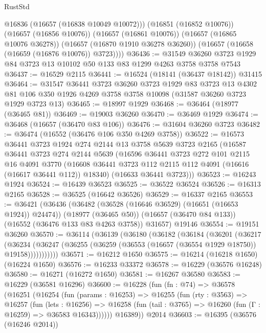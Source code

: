 \begin{lexlean}{RustStd}
\begin{coremodule}
          @16836
          (@16657 (@16838 @10049 @10072)))
        (@16851 (@16852 @10076))
        (@16657 (@16856 @10076))
        (@16657 (@16861 @10076))
        (@16657 (@16865 @10076 @36278))
        (@16657 (@16870 @1910 @36278 @36260))
        (@16657 (@16658 (@16659 (@16876 @10076)) @3723))))
@36436 := @31549 @36260 @3723 @1929 @84 @3723 @13 @10102 @50 @133 @83 @1299 @4263 @3758 @3758 @7543
@36437 := @16529 @2115
@36441 := @16524 (@18141 (@36437 @18142)) @31415
@36464 := @31547
    @36441
    @3723
    @36260
    @3723
    @1929
    @83
    @3723
    @13
    @4302
    @81
    @106
    @350
    @1926
    @4269
    @3758
    @3758
    @10098
    (@31587 @36260 @3723 @1929 @3723 @13)
@36465 := @18997 @1929
@36468 := @36464 (@18977 (@36465 @81))
@36469 := @19003 @36260
@36470 := @36469 @1929
@36474 := @36468 (@16657 (@36470 @83 @106))
@36476 := @31604 @36260 @3723
@36482 := @36474 (@16552 (@36476 @106 @350 @4269 @3758))
@36522 := @16573
    @36441
    @3723
    @1924
    @274
    @2144
    @13
    @3758
    @5639
    @3723
    @2165
    (@16587
      @36441
      @3723
      @274
      @2144
      @5639
      (@16596
        @36441
        @3723
        @272
        @101
        @2115
        @16
        @4091
        @3770
        (@16608 @36441 @3723 @112 @2115 @112 @4091 (@16616 (@16617 @36441 @112)) @18340)
        (@16633 @36441 @3723)))
@36523 := @16243 @1924
@36524 := @16439 @36523
@36525 := @36522 @36524
@36526 := @16313 @2165
@36528 := @36525 (@16642 @36526)
@36529 := @16337 @2165
@36553 := @36421
    (@36436
      (@36482 (@36528 (@16646 @36529) (@16651 (@16653 @1924)) @24474))
      (@18977 (@36465 @50))
      (@16657 (@36470 @84 @133))
      (@16552 (@36476 @133 @83 @4263 @3758))
      @31657)
    @19146
@36554 := @19151 @36260
@36570 := @36114
    (@36139
      (@36180
        (@36182
          (@36184
            (@36201
              (@36217
                (@36234
                  (@36247 (@36255 (@36259 (@36553 (@16657 (@36554 @1929 @18750)) @19158)))))))))))
@36571 := @16212 @1650
@36575 := @16214 (@16218 @1650) (@16224 @1650)
@36576 := @16233 @33372
@36578 := @16229 (@36576 @16248)
@36580 := @16271 (@16272 @1650)
@36581 := @16267 @36580
@36583 := @16229 (@36581 @16296)
@36600 := @16228
    (fun (fn : @74) =>
    @36578
      (@16251
        (@16254
          (fun (params : @16253) =>
          @16255
            (fun (rty : @3563) =>
            @16257
              (fun (lets : @16256) =>
              @16258 (fun (tail : @3765) => @16260 (fun (Γ : @16259) => @36583 @16343))))))
        @16389))
    @2014
@36603 := @16395 (@36576 (@16246 @2014))

\end{coremodule}
\end{lexlean}
